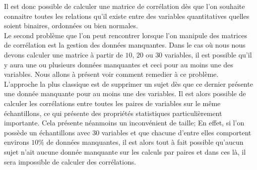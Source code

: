 Il est donc possible de calculer une matrice de corrélation dès que l'on souhaite connaitre toutes les relations qu'il existe entre des variables quantitatives quelles soient binaires, ordonnées ou bien normales.\newline
\\
Le second problème que l'on peut rencontrer lorsque l'on manipule des matrices de corrélation est la gestion des données manquantes. Dans le cas où nous nous devons calculer une matrice à partir de $10$, $20$ ou $30$ variables, il est possible qu'il y aura une ou plusieurs données manquantes et ceci pour au moins une des variables. Nous allons à présent voir comment remedier à ce problème.\newline
L'approche la plus classique est de supprimer un sujet dès que ce dernier présente une donnée manquante pour au moins une des variables. Il est alors possible de calculer les corrélations entre toutes les paires de variables sur le même échantillons, ce qui présente des propriétés statistiques particulièrement importante. Cela présente néanmoins un inconvénient de taille; En effet, si l'on possède un échantillons avec 30 variables et que chacune d'entre elles comportent environs $10\%$ de données manquantes, il est alors tout à fait possible qu'aucun sujet n'ait aucune donnée manquante sur les calculs par paires et dans ces là, il sera impossible de calculer des corrélations.\newline 


